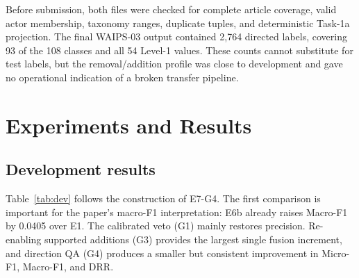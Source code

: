 \documentclass[sigconf,article,a4paper]{acmart}
\begin{document}
Before submission, both files were checked for complete article coverage,
valid actor membership, taxonomy ranges, duplicate tuples, and deterministic
Task-1a projection. The final WAIPS-03 output contained 2,764 directed labels,
covering 93 of the 108 classes and all 54 Level-1 values. These counts cannot
substitute for test labels, but the removal/addition profile was close to
development and gave no operational indication of a broken transfer pipeline.

\section{Experiments and Results}
\label{sec:results}

\subsection{Development results}

Table~\ref{tab:dev} follows the construction of E7-G4. The first comparison is
important for the paper's macro-F1 interpretation: E6b already raises
Macro-F1 by 0.0405 over E1. The calibrated veto (G1) mainly restores precision.
Re-enabling supported additions (G3) provides the largest single fusion
increment, and direction QA (G4) produces a smaller but consistent improvement
in Micro-F1, Macro-F1, and DRR.

\begin{table}[H]
  \caption{Development results. T18 is Micro-F1 over the 18 augmentation targets.}
  \label{tab:dev}
  \centering
\end{table}
\end{document}
